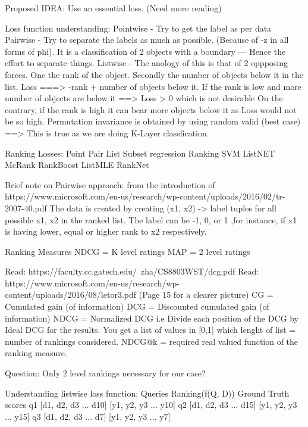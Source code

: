 \documentclass[12pt, twoside, ngerman]{report}
\begin{document}
Proposed IDEA:
    Use an essential loss. (Need more reading)

Loss function understanding:
Pointwise - Try to get the label as per data
Pairwise - Try to separate the labels as much as possible. (Because of -z in all forms of phi).
           It is a classification of 2 objects with a boundary --- Hence the effort to separate things.
Listwise - The anology of this is that of 2 oppposing forces. One the rank of the object. Secondly
           the number of objects below it in the list.
           Loss ===> -rank + number of objects below it.
                If the rank is low and more number of objects are below it ==> Loss > 0 which is not desirable
                On the contrary, if the rank is high it can bear more objects below it as Loss would not be so high.
           Permutation invariance is obtained by using random valid (best case)
        ==> This is true as we are doing K-Layer classfication.


Ranking Losses:
    Point               Pair            List
    Subset regression   Ranking SVM     ListNET
    McRank              RankBoost       ListMLE
                        RankNet

Brief note on Pairwise approach: from the introduction of https://www.microsoft.com/en-us/research/wp-content/uploads/2016/02/tr-2007-40.pdf
    The data is created by creating (x1, x2) -> label tuples for all possible x1, x2 in the ranked list. The label can be -1, 0, or 1
    ,for instance, if x1 is having lower, equal or higher rank to x2 respectively.

Ranking Measures
    NDCG = K level ratings
    MAP = 2 level ratings

    Read: https://faculty.cc.gatech.edu/~zha/CS8803WST/dcg.pdf
    Read: https://www.microsoft.com/en-us/research/wp-content/uploads/2016/08/letor3.pdf (Page 15 for a clearer picture)
        CG = Cumulated gain (of information)
        DCG = Discounted cumulated gain (of information)
        NDCG = Normalized DCG i.e Divide each position of the DCG by Ideal DCG for the results.
               You get a list of values in [0,1] which lenght of list = number of rankings considered.
        NDCG@k = required real valued function of the ranking measure.

    Question: Only 2 level rankings necessary for our case?

Understanding listwise loss function:
    Queries       Ranking(f(Q, D))      Ground Truth scores
    q1        [d1, d2, d3 ... d10]      [y1, y2, y3 ... y10]
    q2        [d1, d2, d3 ... d15]      [y1, y2, y3 ... y15]
    q3        [d1, d2, d3 ... d7]       [y1, y2, y3 ... y7]
\end{document}
